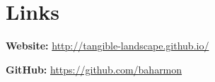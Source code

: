 \documentclass[]{baharmon-cv}
\begin{document}
\section{Links} 
\begin{minipage}{0.45\textwidth} 
\textbf{Website:} \href{http://tangible-landscape.github.io/}{http://tangible-landscape.github.io/} %
\end{minipage} 
\begin{minipage}{0.45\textwidth} 
\textbf{GitHub:} \href{https://github.com/baharmon}{https://github.com/baharmon} 
\end{minipage} 
\end{document}
